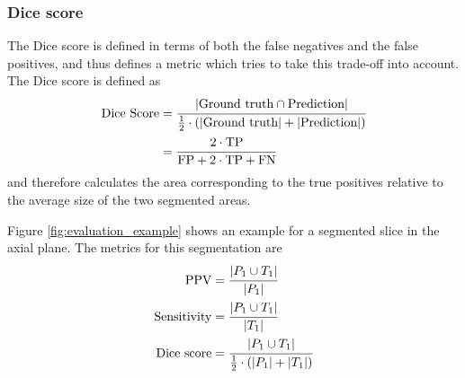 \documentclass[12pt,a4paper,twoside,openright]{report}
\begin{document}
\subsubsection{Dice score}
The Dice score is defined in terms of both the false negatives and the false positives, and thus defines a metric which tries to take this trade-off into account. The Dice score is defined as
\begin{equation}
\begin{split}
	\textrm{Dice Score} & = \cfrac{\vert \textrm{Ground truth} \cap \textrm{Prediction}\vert}{\frac{1}{2} \cdot (\vert \textrm{Ground truth}\vert + \vert \textrm{Prediction}\vert)} \\
	&  = \cfrac{2 \cdot \textrm{TP}}{\textrm{FP} + 2 \cdot \textrm{TP} + \textrm{FN}}
\end{split}
\end{equation}
and therefore calculates the area corresponding to the true positives relative to the average size of the two segmented areas.

Figure \ref{fig:evaluation_example} shows an example for a segmented slice in the axial plane.  The metrics for this segmentation are
\begin{equation*}
\begin{split}
	\textrm{PPV} & = \cfrac{\vert P_1 \cup T_1 \vert}{\vert P_1 \vert} \\
	\textrm{Sensitivity} & = \cfrac{\vert P_1 \cup T_1 \vert}{\vert T_1 \vert} \\
	\textrm{Dice score} & = \cfrac{\vert P_1 \cup T_1 \vert}{\frac{1}{2} \cdot (\vert P_1 \vert + \vert T_1 \vert)} \\
\end{split}
\end{equation*}
\end{document}
